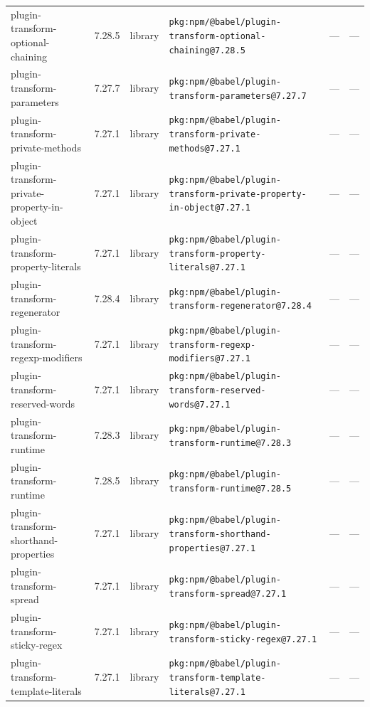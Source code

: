 \documentclass[11pt,a4paper]{article}
\begin{document}
\begin{longtable}{|p{4cm}|p{2cm}|p{1.6cm}|p{5cm}|p{1.5cm}|p{3.5cm}|}
\raggedright plugin-transform-optional-chaining & 7.28.5 & library & \small\texttt{pkg:npm/@babel/plugin-transform-optional-chaining@7.28.5} & — & \small — \\
\raggedright plugin-transform-parameters & 7.27.7 & library & \small\texttt{pkg:npm/@babel/plugin-transform-parameters@7.27.7} & — & \small — \\
\raggedright plugin-transform-private-methods & 7.27.1 & library & \small\texttt{pkg:npm/@babel/plugin-transform-private-methods@7.27.1} & — & \small — \\
\raggedright plugin-transform-private-property-in-object & 7.27.1 & library & \small\texttt{pkg:npm/@babel/plugin-transform-private-property-in-object@7.27.1} & — & \small — \\
\raggedright plugin-transform-property-literals & 7.27.1 & library & \small\texttt{pkg:npm/@babel/plugin-transform-property-literals@7.27.1} & — & \small — \\
\raggedright plugin-transform-regenerator & 7.28.4 & library & \small\texttt{pkg:npm/@babel/plugin-transform-regenerator@7.28.4} & — & \small — \\
\raggedright plugin-transform-regexp-modifiers & 7.27.1 & library & \small\texttt{pkg:npm/@babel/plugin-transform-regexp-modifiers@7.27.1} & — & \small — \\
\raggedright plugin-transform-reserved-words & 7.27.1 & library & \small\texttt{pkg:npm/@babel/plugin-transform-reserved-words@7.27.1} & — & \small — \\
\raggedright plugin-transform-runtime & 7.28.3 & library & \small\texttt{pkg:npm/@babel/plugin-transform-runtime@7.28.3} & — & \small — \\
\raggedright plugin-transform-runtime & 7.28.5 & library & \small\texttt{pkg:npm/@babel/plugin-transform-runtime@7.28.5} & — & \small — \\
\raggedright plugin-transform-shorthand-properties & 7.27.1 & library & \small\texttt{pkg:npm/@babel/plugin-transform-shorthand-properties@7.27.1} & — & \small — \\
\raggedright plugin-transform-spread & 7.27.1 & library & \small\texttt{pkg:npm/@babel/plugin-transform-spread@7.27.1} & — & \small — \\
\raggedright plugin-transform-sticky-regex & 7.27.1 & library & \small\texttt{pkg:npm/@babel/plugin-transform-sticky-regex@7.27.1} & — & \small — \\
\raggedright plugin-transform-template-literals & 7.27.1 & library & \small\texttt{pkg:npm/@babel/plugin-transform-template-literals@7.27.1} & — & \small — \\

\end{longtable}
\end{document}
